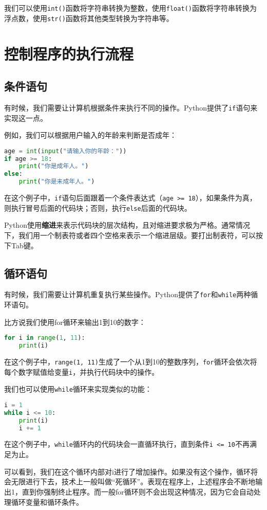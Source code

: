 \documentclass[../main.tex]{subfiles}
\begin{document}
我们可以使用\texttt{int()}函数将字符串转换为整数，使用\texttt{float()}函数将字符串转换为浮点数，使用\texttt{str()}函数将其他类型转换为字符串等。

\section{控制程序的执行流程}

\subsection{条件语句}

有时候，我们需要让计算机根据条件来执行不同的操作。Python提供了\texttt{if}语句来实现这一点。

例如，我们可以根据用户输入的年龄来判断是否成年：
\begin{lstlisting}[language=python]
age = int(input("请输入你的年龄："))
if age >= 18:
    print("你是成年人。")
else:
    print("你是未成年人。")
\end{lstlisting}
在这个例子中，\texttt{if}语句后面跟着一个条件表达式（\texttt{age >=
18}），如果条件为真，则执行冒号后面的代码块；否则，执行\texttt{else}后面的代码块。

Python使用\textbf{缩进}来表示代码块的层次结构，且对缩进要求极为严格。通常情况下，我们用一个制表符或者四个空格来表示一个缩进层级。要打出制表符，可以按下Tab键。

\subsection{循环语句}

有时候，我们需要让计算机重复执行某些操作。Python提供了\texttt{for}和\texttt{while}两种循环语句。

比方说我们使用for循环来输出1到10的数字：
\begin{lstlisting}[language=python]
for i in range(1, 11):
    print(i)
\end{lstlisting}
在这个例子中，\texttt{range(1,
11)}生成了一个从1到10的整数序列，\texttt{for}循环会依次将每个数字赋值给变量\texttt{i}，并执行代码块中的操作。

我们也可以使用\texttt{while}循环来实现类似的功能：
\begin{lstlisting}[language=python]
i = 1
while i <= 10:
    print(i)
    i += 1
\end{lstlisting}
在这个例子中，\texttt{while}循环内的代码块会一直循环执行，直到条件\texttt{i <= 10}不再满足为止。

可以看到，我们在这个循环内部对i进行了增加操作。如果没有这个操作，循环将会无限进行下去，技术上一般叫做“死循环”。表现在程序上，上述程序会不断地输出1，直到你强制终止程序。而一般for循环则不会出现这种情况，因为它会自动处理循环变量和循环条件。
\end{document}
